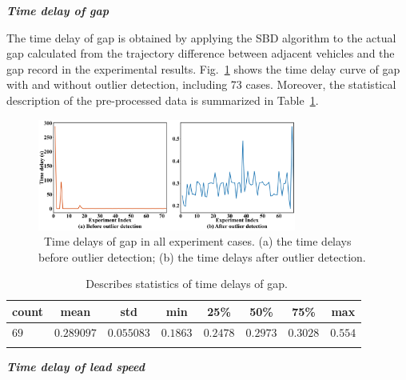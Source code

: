 \documentclass[journal]{IEEEtran}
\begin{document}


\textbf{\emph{Time delay of gap}}

The time delay of gap is obtained by applying the SBD algorithm to the actual gap calculated from the trajectory difference between adjacent vehicles and the gap record in the experimental results. Fig.~\ref{fig4} shows the time delay curve of gap with and without outlier detection, including 73 cases. Moreover, the statistical description of the pre-processed data is summarized in Table~\ref{table3}.

\begin{figure}
  \centering
  \includegraphics[width=8.5cm]{figs/fig4.png}
  \caption{~Time delays of gap in all experiment cases. (a) the time delays before outlier detection; (b) the time delays after outlier detection.}
  \label{fig4}
\end{figure}

\begin{table}
  \centering
  \setlength{\abovecaptionskip}{0pt}
  \setlength{\belowcaptionskip}{10pt}%
  \caption{~Describes statistics of time delays of gap.}
  {\begin{tabular}{lccccccc} \toprule
      count & mean       & std        & min      & 25\%     & 50\%     & 75\%     & max     \\ \midrule
      $69$  & $0.289097$ & $0.055083$ & $0.1863$ & $0.2478$ & $0.2973$ & $0.3028$ & $0.554$ \\
      \bottomrule
      \label{table3}
    \end{tabular}}
\end{table}

\textbf{\emph{Time delay of lead speed}}
\end{document}

